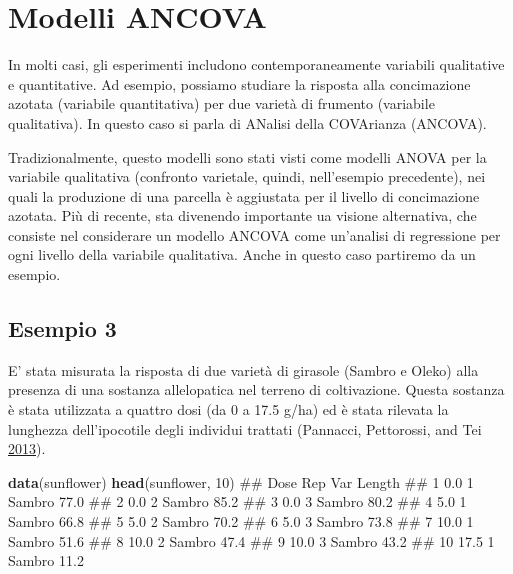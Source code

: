 \documentclass[a4paper,12pt,oneside]{book}
\newenvironment{Shaded}{\begin{snugshade}}{\end{snugshade}}
\newcommand{\KeywordTok}[1]{\textcolor[rgb]{0.13,0.29,0.53}{\textbf{#1}}}
\newcommand{\DecValTok}[1]{\textcolor[rgb]{0.00,0.00,0.81}{#1}}
\newcommand{\NormalTok}[1]{#1}
\theoremstyle{definition}
\theoremstyle{definition}
\theoremstyle{definition}
\theoremstyle{remark}
\begin{document}
\section{Modelli ANCOVA}\label{modelli-ancova}

In molti casi, gli esperimenti includono contemporaneamente variabili
qualitative e quantitative. Ad esempio, possiamo studiare la risposta
alla concimazione azotata (variabile quantitativa) per due varietà di
frumento (variabile qualitativa). In questo caso si parla di ANalisi
della COVArianza (ANCOVA).

Tradizionalmente, questo modelli sono stati visti come modelli ANOVA per
la variabile qualitativa (confronto varietale, quindi, nell'esempio
precedente), nei quali la produzione di una parcella è aggiustata per il
livello di concimazione azotata. Più di recente, sta divenendo
importante ua visione alternativa, che consiste nel considerare un
modello ANCOVA come un'analisi di regressione per ogni livello della
variabile qualitativa. Anche in questo caso partiremo da un esempio.

\subsection{Esempio 3}\label{esempio-3-2}

E' stata misurata la risposta di due varietà di girasole (Sambro e
Oleko) alla presenza di una sostanza allelopatica nel terreno di
coltivazione. Questa sostanza è stata utilizzata a quattro dosi (da 0 a
17.5 g/ha) ed è stata rilevata la lunghezza dell'ipocotile degli
individui trattati (Pannacci, Pettorossi, and Tei
\protect\hyperlink{ref-pannacci2013_Phytotoxiceffectsaqueous}{2013}).

\begin{Shaded}
\begin{Highlighting}[]
\KeywordTok{data}\NormalTok{(sunflower)}
\KeywordTok{head}\NormalTok{(sunflower, }\DecValTok{10}\NormalTok{)}
\NormalTok{##    Dose Rep     Var Length}
\NormalTok{## 1   0.0   1 Sambro    77.0}
\NormalTok{## 2   0.0   2 Sambro    85.2}
\NormalTok{## 3   0.0   3 Sambro    80.2}
\NormalTok{## 4   5.0   1 Sambro    66.8}
\NormalTok{## 5   5.0   2 Sambro    70.2}
\NormalTok{## 6   5.0   3 Sambro    73.8}
\NormalTok{## 7  10.0   1 Sambro    51.6}
\NormalTok{## 8  10.0   2 Sambro    47.4}
\NormalTok{## 9  10.0   3 Sambro    43.2}
\NormalTok{## 10 17.5   1 Sambro    11.2}
\end{Highlighting}
\end{Shaded}
\end{document}
